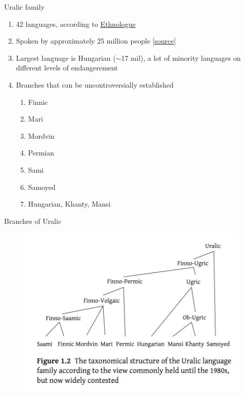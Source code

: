 \documentclass[10 pt, handout]{beamer}
\begin{document}
\begin{frame}{Uralic family}

	\begin{enumerate}[$\gg$]
		\item 42 languages, according to \href{https://www.ethnologue.com/subgroup/1083/}{Ethnologue}
		\item Spoken by approximately 25 million people [\href{https://www.britannica.com/topic/Uralic-languages}{source}]
		\item Largest language is Hungarian ($\sim$17 mil), a lot of minority languages on different levels of endangerement
		\item Branches that can be uncontroversially established \parencite{salminen2002}
			\begin{enumerate}[$\cdot$]
			\normalsize
			\setlength\itemsep{0em}
				\item Finnic
				\item Mari
				\item Mordvin
				\item Permian
				\item Sami
				\item Samoyed
				\item Hungarian, Khanty, Mansi
			\end{enumerate}
	\end{enumerate}

\end{frame}

\begin{frame}{Branches of Uralic}

	\begin{figure}[H]
		\centering
		\includegraphics[scale=.65]{uralic-1980s}
		\parencite{aikio2022}
	\end{figure}

\end{frame}
\end{document}
